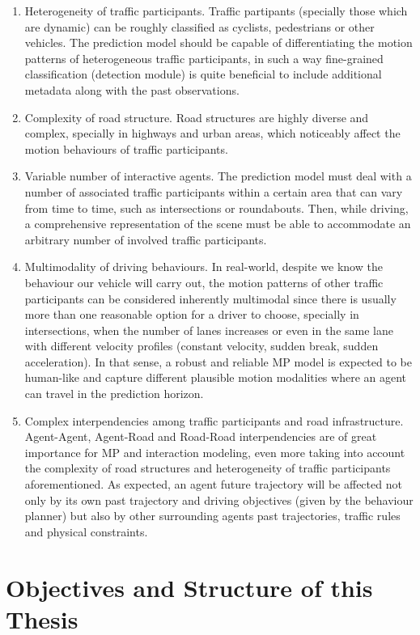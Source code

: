 \begin{enumerate}
	\item Heterogeneity of traffic participants. Traffic partipants (specially those which are dynamic) can be roughly classified as cyclists, pedestrians or other vehicles. The prediction model should be capable of differentiating the motion patterns of heterogeneous traffic participants, in such a way fine-grained classification (detection module) is quite beneficial to include additional metadata along with the past observations.
	\item Complexity of road structure. Road structures are highly diverse and complex, specially in highways and urban areas, which noticeably affect the motion behaviours of traffic participants.
	\item Variable number of interactive agents. The prediction model must deal with a number of associated traffic participants within a certain area that can vary from time to time, such as intersections or roundabouts. Then, while driving, a comprehensive representation of the scene must be able to accommodate an arbitrary number of involved traffic participants.
	\item Multimodality of driving behaviours. In real-world, despite we know the behaviour our vehicle will carry out, the motion patterns of other traffic participants can be considered inherently multimodal since there is usually more than one reasonable option for a driver to choose, specially in intersections, when the number of lanes increases or even in the same lane with different velocity profiles (constant velocity, sudden break, sudden acceleration). In that sense, a robust and reliable \ac{MP} model is expected to be human-like and capture different plausible motion modalities where an agent can travel in the prediction horizon.
	\item Complex interpendencies among traffic participants and road infrastructure. Agent-Agent, Agent-Road and Road-Road interpendencies are of great importance for \ac{MP} and interaction modeling, even more taking into account the complexity of road structures and heterogeneity of traffic participants aforementioned. As expected, an agent future trajectory will be affected not only by its own past trajectory and driving objectives (given by the behaviour planner) but also by other surrounding agents past trajectories, traffic rules and physical constraints.
\end{enumerate}

\section{Objectives and Structure of this Thesis}
\label{sec:1_objectives_and_structure}

